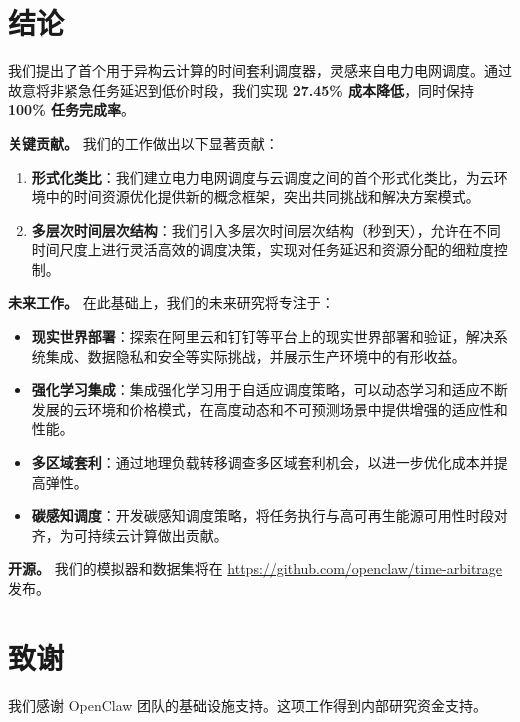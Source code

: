 \documentclass[10pt,a4paper]{article}
\begin{document}
\section{结论}
\label{sec:conclusion}

我们提出了首个用于异构云计算的时间套利调度器，灵感来自电力电网调度。通过故意将非紧急任务延迟到低价时段，我们实现 \textbf{27.45\% 成本降低}，同时保持 \textbf{100\% 任务完成率}。

\textbf{关键贡献。} 我们的工作做出以下显著贡献：
\begin{enumerate}
    \item \textbf{形式化类比}：我们建立电力电网调度与云调度之间的首个形式化类比，为云环境中的时间资源优化提供新的概念框架，突出共同挑战和解决方案模式。
    \item \textbf{多层次时间层次结构}：我们引入多层次时间层次结构（秒到天），允许在不同时间尺度上进行灵活高效的调度决策，实现对任务延迟和资源分配的细粒度控制。
\end{enumerate}

\textbf{未来工作。} 在此基础上，我们的未来研究将专注于：
\begin{itemize}
    \item \textbf{现实世界部署}：探索在阿里云和钉钉等平台上的现实世界部署和验证，解决系统集成、数据隐私和安全等实际挑战，并展示生产环境中的有形收益。
    \item \textbf{强化学习集成}：集成强化学习用于自适应调度策略，可以动态学习和适应不断发展的云环境和价格模式，在高度动态和不可预测场景中提供增强的适应性和性能。
    \item \textbf{多区域套利}：通过地理负载转移调查多区域套利机会，以进一步优化成本并提高弹性。
    \item \textbf{碳感知调度}：开发碳感知调度策略，将任务执行与高可再生能源可用性时段对齐，为可持续云计算做出贡献。
\end{itemize}

\textbf{开源。} 我们的模拟器和数据集将在 \url{https://github.com/openclaw/time-arbitrage} 发布。

\section*{致谢}

我们感谢 OpenClaw 团队的基础设施支持。这项工作得到内部研究资金支持。
\end{document}
